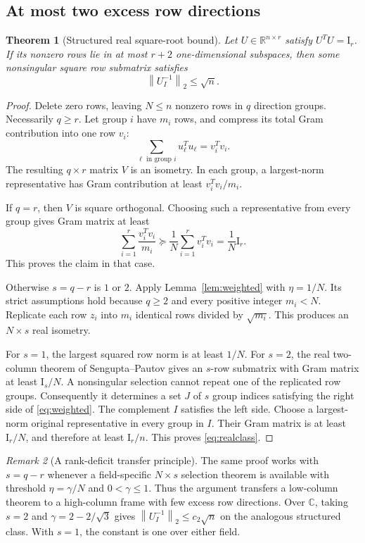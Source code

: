 \documentclass[11pt,letterpaper]{article}
\newtheorem{theorem}{Theorem}[section]
\theoremstyle{definition}
\theoremstyle{remark}
\newtheorem{remark}[theorem]{Remark}
\newcommand{\R}{\mathbb R}
\newcommand{\C}{\mathbb C}
\newcommand{\Id}{\mathrm I}
\newcommand{\norm}[1]{\left\lVert#1\right\rVert}
\begin{document}
\subsection{At most two excess row directions}

\begin{theorem}[Structured real square-root bound]\label{thm:realclass}
Let $U\in\R^{n\times r}$ satisfy $U^TU=\Id_r$. If its nonzero rows lie in at most $r+2$ one-dimensional subspaces, then some nonsingular square row submatrix satisfies
\begin{equation}
 \norm{U_I^{-1}}_2\le\sqrt n.
 \label{eq:realclass}
\end{equation}
\end{theorem}
\begin{proof}
Delete zero rows, leaving $N\le n$ nonzero rows in $q$ direction groups. Necessarily $q\ge r$. Let group $i$ have $m_i$ rows, and compress its total Gram contribution into one row $v_i$:
\[
 \sum_{\ell\text{ in group }i}u_\ell^Tu_\ell=v_i^Tv_i.
\]
The resulting $q\times r$ matrix $V$ is an isometry. In each group, a largest-norm representative has Gram contribution at least $v_i^Tv_i/m_i$.

If $q=r$, then $V$ is square orthogonal. Choosing such a representative from every group gives Gram matrix at least
\[
 \sum_{i=1}^r\frac{v_i^Tv_i}{m_i}
 \succeq\frac1N\sum_{i=1}^r v_i^Tv_i=\frac1N\Id_r.
\]
This proves the claim in that case.

Otherwise $s=q-r$ is $1$ or $2$. Apply Lemma~\ref{lem:weighted} with $\eta=1/N$. Its strict assumptions hold because $q\ge2$ and every positive integer $m_i<N$. Replicate each row $z_i$ into $m_i$ identical rows divided by $\sqrt{m_i}$. This produces an $N\times s$ real isometry.

For $s=1$, the largest squared row norm is at least $1/N$. For $s=2$, the real two-column theorem of Sengupta--Pautov gives an $s$-row submatrix with Gram matrix at least $\Id_s/N$. A nonsingular selection cannot repeat one of the replicated row groups. Consequently it determines a set $J$ of $s$ group indices satisfying the right side of \eqref{eq:weighted}. The complement $I$ satisfies the left side. Choose a largest-norm original representative in every group in $I$. Their Gram matrix is at least $\Id_r/N$, and therefore at least $\Id_r/n$. This proves \eqref{eq:realclass}.
\end{proof}

\begin{remark}[A rank-deficit transfer principle]
The same proof works with $s=q-r$ whenever a field-specific $N\times s$ selection theorem is available with threshold $\eta=\gamma/N$ and $0<\gamma\le1$. Thus the argument transfers a low-column theorem to a high-column frame with few excess row directions. Over $\C$, taking $s=2$ and $\gamma=2-2/\sqrt3$ gives $\norm{U_I^{-1}}_2\le c_2\sqrt n$ on the analogous structured class. With $s=1$, the constant is one over either field.
\end{remark}
\end{document}
